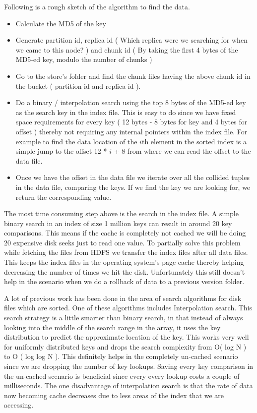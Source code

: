 \documentclass[10pt,twocolumn,preprint,natbib,authoryear]{sigplanconf}
\begin{document}
Following is a rough sketch of the algorithm to find the data. 

\begin{itemize}
	\item Calculate the MD5 of the key
	\item Generate partition id, replica id ( Which replica were we searching for when we came to this node? ) and chunk id ( By taking the first 4 bytes of the MD5-ed key, modulo the number of chunks )
	\item Go to the store's folder and find the chunk files having the above chunk id in the bucket ( partition id and replica id ). 
	\item Do a binary / interpolation search using the top 8 bytes of the MD5-ed key as the search key in the index file. This is easy to do since we have fixed space requirements for every key ( 12 bytes - 8 bytes for key and 4 bytes for offset ) thereby not requiring any internal pointers within the index file. For example to find the data location of the $i$th element in the sorted index is a simple jump to the offset 12 * $i$ + 8 from where we can read the offset to the data file.  
	\item Once we have the offset in the data file we iterate over all the collided tuples in the data file, comparing the keys. If we find the key we are looking for, we return the corresponding value.
\end{itemize}

The most time consuming step above is the search in the index file. A simple binary search in an index of size 1 million keys can result in around 20 key comparisons. This means if the cache is completely not cached we will be doing 20 expensive disk seeks just to read one value. To partially solve this problem while fetching the files from HDFS we transfer the index files after all data files. This keeps the index files in the operating system's page cache thereby helping decreasing the number of times we hit the disk. Unfortunately this still doesn't help in the scenario when we do a rollback of data to a previous version folder. 

A lot of previous work has been done in the area of search algorithms for disk files which are sorted. One of these algorithms includes Interpolation search\cite{An adaptation of a root finding method to searching ordered disk files}. This search strategy is a little smarter than binary search, in that instead of always looking into the middle of the search range in the array, it uses the key distribution to predict the approximate location of the key. This works very well for uniformly distributed keys and drops the search complexity from O( log N ) to O ( log log N ). This definitely helps in the completely un-cached scenario since we are dropping the number of key lookups. Saving every key comparison in the un-cached scenario is beneficial since every every lookup costs a couple of milliseconds. The one disadvantage of interpolation search is that the rate of data now becoming cache decreases due to less areas of the index that we are accessing. 
\end{document}

